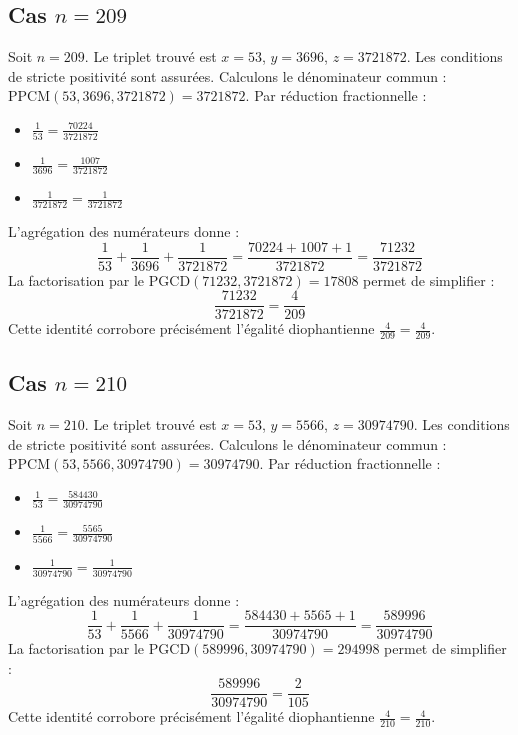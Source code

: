 \documentclass[11pt,a4paper]{article}
\begin{document}
\subsection{Cas $n = 209$}
Soit $n = 209$. Le triplet trouvé est $x = 53$, $y = 3696$, $z = 3721872$.
Les conditions de stricte positivité sont assurées.
Calculons le dénominateur commun : $\text{PPCM}(53, 3696, 3721872) = 3721872$.
Par réduction fractionnelle :
\begin{itemize}
    \item $\frac{1}{53} = \frac{70224}{3721872}$
    \item $\frac{1}{3696} = \frac{1007}{3721872}$
    \item $\frac{1}{3721872} = \frac{1}{3721872}$
\end{itemize}
L'agrégation des numérateurs donne :
$$ \frac{1}{53} + \frac{1}{3696} + \frac{1}{3721872} = \frac{70224 + 1007 + 1}{3721872} = \frac{71232}{3721872} $$
La factorisation par le $\text{PGCD}(71232, 3721872) = 17808$ permet de simplifier :
$$ \frac{71232}{3721872} = \frac{4}{209} $$
Cette identité corrobore précisément l'égalité diophantienne $\frac{4}{209} = \frac{4}{209}$.

\subsection{Cas $n = 210$}
Soit $n = 210$. Le triplet trouvé est $x = 53$, $y = 5566$, $z = 30974790$.
Les conditions de stricte positivité sont assurées.
Calculons le dénominateur commun : $\text{PPCM}(53, 5566, 30974790) = 30974790$.
Par réduction fractionnelle :
\begin{itemize}
    \item $\frac{1}{53} = \frac{584430}{30974790}$
    \item $\frac{1}{5566} = \frac{5565}{30974790}$
    \item $\frac{1}{30974790} = \frac{1}{30974790}$
\end{itemize}
L'agrégation des numérateurs donne :
$$ \frac{1}{53} + \frac{1}{5566} + \frac{1}{30974790} = \frac{584430 + 5565 + 1}{30974790} = \frac{589996}{30974790} $$
La factorisation par le $\text{PGCD}(589996, 30974790) = 294998$ permet de simplifier :
$$ \frac{589996}{30974790} = \frac{2}{105} $$
Cette identité corrobore précisément l'égalité diophantienne $\frac{4}{210} = \frac{4}{210}$.
\end{document}
